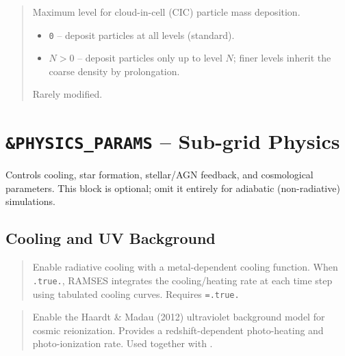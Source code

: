 \label{param:cic_levelmax}

\begin{quote}
Maximum level for cloud-in-cell (CIC) particle mass deposition.
\begin{itemize}[nosep]
  \item \texttt{0} -- deposit particles at all levels (standard).
  \item $N > 0$ -- deposit particles only up to level $N$; finer
    levels inherit the coarse density by prolongation.
\end{itemize}
Rarely modified.
\end{quote}


\section{\texttt{\&PHYSICS\_PARAMS} -- Sub-grid Physics}
\label{sec:physics_params}

Controls cooling, star formation, stellar/AGN feedback, and
cosmological parameters.  This block is optional; omit it entirely
for adiabatic (non-radiative) simulations.

\subsection{Cooling and UV Background}

\label{param:cooling}

\begin{quote}
Enable radiative cooling with a metal-dependent cooling function.
When \texttt{.true.}, RAMSES integrates the cooling/heating rate
at each time step using tabulated cooling curves.  Requires
\texttt{=.true.}
\end{quote}

\label{param:haardt_madau}

\begin{quote}
Enable the Haardt \& Madau (2012) ultraviolet background model for
cosmic reionization.  Provides a redshift-dependent photo-heating
and photo-ionization rate.  Used together with .
\end{quote}

